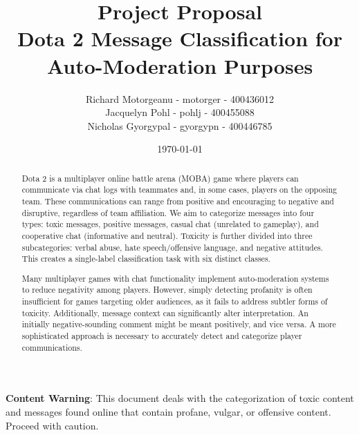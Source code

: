 \documentclass[11pt, letterpaper, notitlepage]{article}
\title{Project Proposal \\ Dota 2 Message Classification for Auto-Moderation Purposes}
\author{Richard Motorgeanu - motorger - 400436012\\ Jacquelyn Pohl - pohlj - 400455088\\ Nicholas Gyorgypal - gyorgypn - 400446785}
\date{\today}
\begin{document}
\maketitle


\vspace{1em}

\textbf{Content Warning}: This document deals with the categorization of toxic content and messages found online that contain profane, vulgar, or offensive content. Proceed with caution.

\vspace{2em}

\noindent
\begin{abstract}



    Dota 2 is a multiplayer online battle arena (MOBA) game where players can communicate via chat logs with teammates and, in some cases, players on the opposing team. These communications can range from positive and encouraging to negative and disruptive, regardless of team affiliation. We aim to categorize messages into four types: toxic messages, positive messages, casual chat (unrelated to gameplay), and cooperative chat (informative and neutral). Toxicity is further divided into three subcategories: verbal abuse, hate speech/offensive language, and negative attitudes. This creates a single-label classification task with six distinct classes.

    Many multiplayer games with chat functionality implement auto-moderation systems to reduce negativity among players. However, simply detecting profanity is often insufficient for games targeting older audiences, as it fails to address subtler forms of toxicity. Additionally, message context can significantly alter interpretation. An initially negative-sounding comment might be meant positively, and vice versa. A more sophisticated approach is necessary to accurately detect and categorize player communications.

\end{abstract}
\end{document}
